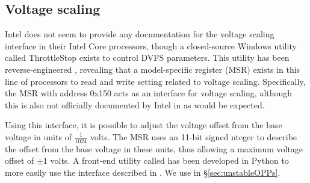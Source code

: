 \subsection{Voltage scaling}

Intel does not seem to provide any documentation for the voltage
scaling interface in their Intel Core processors, though a closed-source
Windows utility called ThrottleStop \cite{throttlestop} exists to control DVFS
parameters. This utility has been reverse-engineered \cite{elersicDoc},
revealing that a model-specific register (MSR) exists in this line of processors
to read and write setting related to voltage scaling. Specifically, the MSR with
address 0x150 acts as an interface for voltage scaling, although this is also
not officially documented by Intel in \cite[Volume 4, §2.13]{intelDevManual} as
would be expected.

Using this interface, it is possible to adjust the voltage offset from the base
voltage in units of $\frac{1}{1024}$ volts. The MSR uses an 11-bit signed 
nteger to describe the offset from the base voltage in these units, thus
allowing a maximum voltage offset of $\pm{1}$ volts. A front-end utility called
 \cite{whewellUndervolt} has been developed in Python to more
easily use the interface described in \cite{elersicDoc}. We use 
in §\ref{sec:unstableOPPs}.
